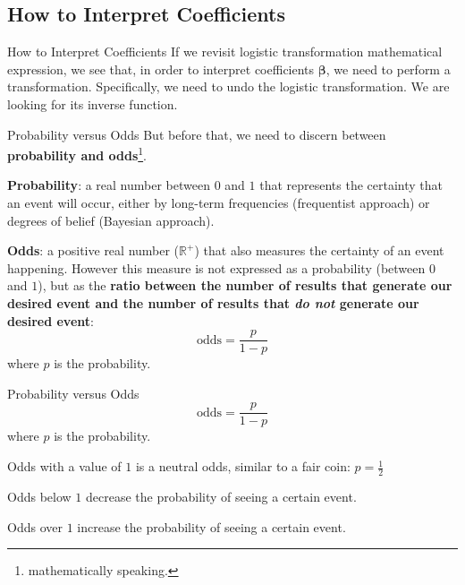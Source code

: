 \subsection{How to Interpret Coefficients}
\begin{frame}{How to Interpret Coefficients}
	If we revisit logistic transformation mathematical expression,
	we see that, in order to interpret coefficients $\boldsymbol{\beta}$,
	we need to perform a transformation.
	\vfill
	Specifically, we need to undo the logistic transformation.
	We are looking for its inverse function.
\end{frame}

\begin{frame}{Probability versus Odds}
	\small
	But before that, we need to discern between
	\textbf{probability and odds}\footnote{mathematically speaking.}.
	\begin{vfilleditems}
		\item \small \textbf{Probability}: a real number between $0$ and $1$
		that represents the certainty that an event will occur,
		either by long-term frequencies (frequentist approach) or
		degrees of belief (Bayesian approach).
		\item \small \textbf{Odds}: a positive real number ($\mathbb{R}^+$)
		that also measures the certainty of an event happening.
		However this measure is not expressed as a probability
		(between $0$ and $1$),
		but as the \textbf{ratio between the number of results that
			generate our desired event and the number of results that
			\textit{do not} generate our desired event}:
		$$
			\text{odds} = \frac{p}{1-p}
		$$
		where $p$ is the probability.
	\end{vfilleditems}
\end{frame}

\begin{frame}{Probability versus Odds}
	$$
		\text{odds} = \frac{p}{1-p}
	$$
	where $p$ is the probability.
	\vfill
	\begin{vfilleditems}
		\item Odds with a value of $1$ is a neutral odds,
		similar to a fair coin: $p = \frac{1}{2}$
		\item Odds below $1$ decrease the probability of seeing a certain event.
		\item Odds over $1$ increase the probability of seeing a certain event.
	\end{vfilleditems}
\end{frame}

